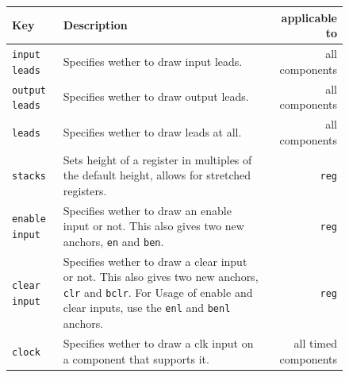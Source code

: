 \documentclass[10pt,a4paper]{scrartcl}
\begin{document}
\begin{figure}[t!]
	\begin{tabularx}{\textwidth}{|lXr|}
		\hline
		Key                   & Description                                                                                                                                                                                           & applicable to        \\
		\hline
		\texttt{input leads}  & Specifies wether to draw input leads.                                                                                                                                                                 & all components       \\
		\texttt{output leads} & Specifies wether to draw output leads.                                                                                                                                                                & all components       \\
		\texttt{leads}        & Specifies wether to draw leads at all.                                                                                                                                                                & all components       \\
		\texttt{stacks}       & Sets height of a register in multiples of the default height, allows for stretched registers.                                                                                                         & \texttt{reg}         \\
		\texttt{enable input} & Specifies wether to draw an enable input or not. This also gives two new anchors, \texttt{en} and \texttt{ben}.                                                                                       & \texttt{reg}         \\
		\texttt{clear input}  & Specifies wether to draw a clear input or not. This also gives two new anchors, \texttt{clr} and \texttt{bclr}. For Usage of enable and clear inputs, use the \texttt{enl} and \texttt{benl} anchors. & \texttt{reg}         \\
		\texttt{clock}        & Specifies wether to draw a clk input on a component that supports it.                                                                                                                                 & all timed components \\

		\hline
	\end{tabularx}
	\label{tab:tikz_keys}
\end{figure}
\end{document}
